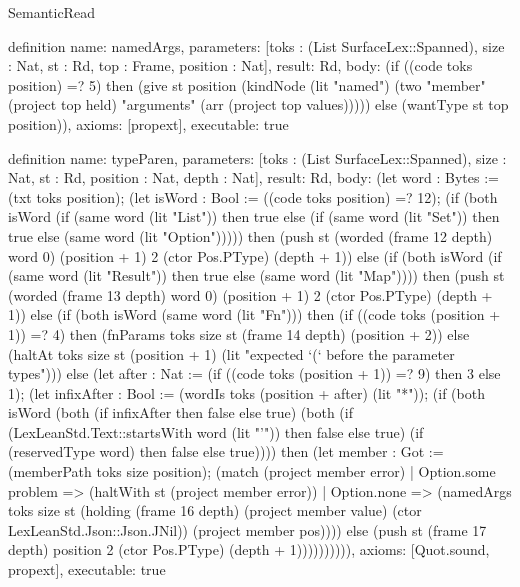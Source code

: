 \begin{lexlean}{SemanticRead}
\begin{semanticmodule}
definition{
  name: namedArgs,
  parameters: [toks : (List SurfaceLex::Spanned), size : Nat, st : Rd, top : Frame, position : Nat],
  result: Rd,
  body: (if ((code toks position) =? 5) then (give st position (kindNode (lit "named") (two "member" (project top held) "arguments" (arr (project top values))))) else (wantType st top position)),
  axioms: [propext],
  executable: true
}

definition{
  name: typeParen,
  parameters: [toks : (List SurfaceLex::Spanned), size : Nat, st : Rd, position : Nat, depth : Nat],
  result: Rd,
  body: (let word : Bytes := (txt toks position); (let isWord : Bool := ((code toks position) =? 12); (if (both isWord (if (same word (lit "List")) then true else (if (same word (lit "Set")) then true else (same word (lit "Option"))))) then (push st (worded (frame 12 depth) word 0) (position + 1) 2 (ctor Pos.PType) (depth + 1)) else (if (both isWord (if (same word (lit "Result")) then true else (same word (lit "Map")))) then (push st (worded (frame 13 depth) word 0) (position + 1) 2 (ctor Pos.PType) (depth + 1)) else (if (both isWord (same word (lit "Fn"))) then (if ((code toks (position + 1)) =? 4) then (fnParams toks size st (frame 14 depth) (position + 2)) else (haltAt toks size st (position + 1) (lit "expected `(` before the parameter types"))) else (let after : Nat := (if ((code toks (position + 1)) =? 9) then 3 else 1); (let infixAfter : Bool := (wordIs toks (position + after) (lit "*")); (if (both isWord (both (if infixAfter then false else true) (both (if (LexLeanStd.Text::startsWith word (lit "'")) then false else true) (if (reservedType word) then false else true)))) then (let member : Got := (memberPath toks size position); (match (project member error)
    | Option.some problem => (haltWith st (project member error))
    | Option.none => (namedArgs toks size st (holding (frame 16 depth) (project member value) (ctor LexLeanStd.Json::Json.JNil)) (project member pos)))) else (push st (frame 17 depth) position 2 (ctor Pos.PType) (depth + 1)))))))))),
  axioms: [Quot.sound, propext],
  executable: true
}


\end{semanticmodule}
\end{lexlean}
